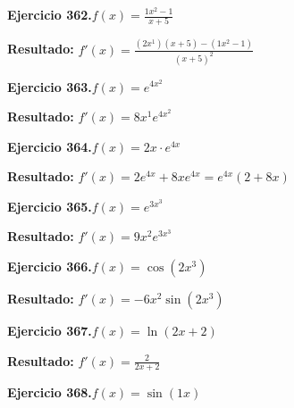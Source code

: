 \documentclass[10pt,a4paper]{article}
\begin{document}
\begin{ejbox}
\textbf{Ejercicio 362.}\quad $f(x) = \frac{1x^{2} -1}{x + 5}$
\end{ejbox}

\begin{solbox}
\textbf{Resultado:} \(\displaystyle f'(x) = \frac{(2x^{1})(x+5) - (1x^{2} -1)}{(x+5)^2}\)
\end{solbox}

\begin{ejbox}
\textbf{Ejercicio 363.}\quad $f(x) = e^{4x^{2}}$
\end{ejbox}

\begin{solbox}
\textbf{Resultado:} \(\displaystyle f'(x) = 8x^{1}e^{4x^{2}}\)
\end{solbox}

\newpage
\begin{ejbox}
\textbf{Ejercicio 364.}\quad $f(x) = 2x \cdot e^{4x}$
\end{ejbox}

\begin{solbox}
\textbf{Resultado:} \(\displaystyle f'(x) = 2e^{4x} + 8xe^{4x} = e^{4x}(2 + 8x)\)
\end{solbox}

\begin{ejbox}
\textbf{Ejercicio 365.}\quad $f(x) = e^{3x^{3}}$
\end{ejbox}

\begin{solbox}
\textbf{Resultado:} \(\displaystyle f'(x) = 9x^{2}e^{3x^{3}}\)
\end{solbox}

\begin{ejbox}
\textbf{Ejercicio 366.}\quad $f(x) = \cos(2x^{3})$
\end{ejbox}

\begin{solbox}
\textbf{Resultado:} \(\displaystyle f'(x) = -6x^{2}\sin(2x^{3})\)
\end{solbox}

\newpage
\begin{ejbox}
\textbf{Ejercicio 367.}\quad $f(x) = \ln(2x + 2)$
\end{ejbox}

\begin{solbox}
\textbf{Resultado:} \(\displaystyle f'(x) = \frac{2}{2x + 2}\)
\end{solbox}

\begin{ejbox}
\textbf{Ejercicio 368.}\quad $f(x) = \sin(1x)$
\end{ejbox}
\end{document}
